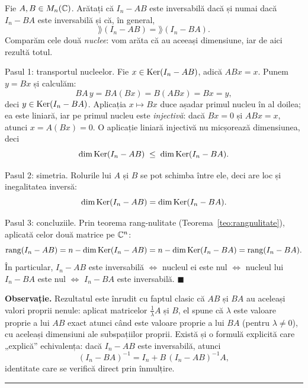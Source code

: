 Fie $A,B \in M_n(\mathbb{C})$. Arătați că $I_n - AB$ este inversabilă dacă și numai dacă $I_n - BA$ este inversabilă și că, în general,
\[
\rang(I_n - AB) = \rang(I_n - BA).
\]
\sol Comparăm cele două \emph{nuclee}: vom arăta că au aceeași dimensiune, iar de aici rezultă totul.

Pasul 1: transportul nucleelor. Fie $x \in \operatorname{Ker}(I_n - AB)$, adică $ABx = x$. Punem $y = Bx$ și calculăm:
\[
BA\,y = BA(Bx) = B(ABx) = Bx = y,
\]
deci $y \in \operatorname{Ker}(I_n - BA)$. Aplicația $x \mapsto Bx$ duce așadar primul nucleu în al doilea; ea este liniară, iar pe primul nucleu este \emph{injectivă}: dacă $Bx = 0$ și $ABx = x$, atunci $x = A(Bx) = 0$. O aplicație liniară injectivă nu micșorează dimensiunea, deci
\[
\dim \operatorname{Ker}(I_n - AB) \;\le\; \dim \operatorname{Ker}(I_n - BA).
\]

Pasul 2: simetria. Rolurile lui $A$ și $B$ se pot schimba între ele, deci are loc și inegalitatea inversă:
\[
\dim \operatorname{Ker}(I_n - AB) = \dim \operatorname{Ker}(I_n - BA).
\]

Pasul 3: concluziile. Prin teorema rang-nulitate (Teorema~\ref{teo:rangnulitate}), aplicată celor două matrice pe $\mathbb{C}^n$:
\[
\operatorname{rang}(I_n - AB) = n - \dim \operatorname{Ker}(I_n - AB) = n - \dim \operatorname{Ker}(I_n - BA) = \operatorname{rang}(I_n - BA).
\]
În particular, $I_n - AB$ este inversabilă $\iff$ nucleul ei este nul $\iff$ nucleul lui $I_n - BA$ este nul $\iff$ $I_n - BA$ este inversabilă. $\blacksquare$

\medskip
\textbf{Observație.} Rezultatul este înrudit cu faptul clasic că $AB$ și $BA$ au aceleași valori proprii nenule: aplicat matricelor $\frac{1}{\lambda}A$ și $B$, el spune că $\lambda$ este valoare proprie a lui $AB$ exact atunci când este valoare proprie a lui $BA$ (pentru $\lambda \neq 0$), cu aceleași dimensiuni ale subspațiilor proprii. Există și o formulă explicită care „explică'' echivalența: dacă $I_n - AB$ este inversabilă, atunci
\[
(I_n - BA)^{-1} = I_n + B\,(I_n - AB)^{-1}A,
\]
identitate care se verifică direct prin înmulțire.
\vspace{1mm}\hrule

